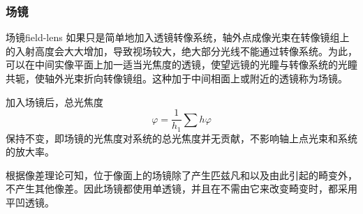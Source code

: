 \documentclass[cn,10pt,chinesefont=founder,math=newtx,cite=super,twoside]{elegantbook}
\begin{document}
\subsubsection{场镜}
\begin{definition}{场镜}{field-lens}
	如果只是简单地加入透镜转像系统，轴外点成像光束在转像镜组上的入射高度会大大增加，导致视场较大，绝大部分光线不能通过转像系统。为此，可以在中间实像平面上加一适当光焦度的透镜，使望远镜的光瞳与转像系统的光瞳共轭，使轴外光束折向转像镜组。这种加于中间相面上或附近的透镜称为场镜。
\end{definition}
加入场镜后，总光焦度
\begin{equation}
\varphi=\frac{1}{h_1}\sum h\varphi
\end{equation}
保持不变，即场镜的光焦度对系统的总光焦度并无贡献，不影响轴上点光束和系统的放大率。

根据像差理论可知，位于像面上的场镜除了产生匹兹凡和以及由此引起的畸变外，不产生其他像差。因此场镜都使用单透镜，并且在不需由它来改变畸变时，都采用平凹透镜。
\end{document}

